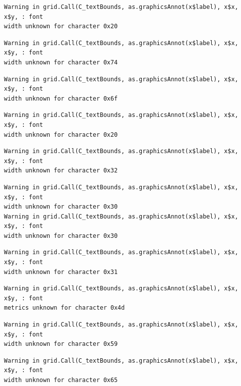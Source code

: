 \documentclass[
  letterpaper,
]{scrbook}
\begin{document}
\begin{verbatim}
Warning in grid.Call(C_textBounds, as.graphicsAnnot(x$label), x$x, x$y, : font
width unknown for character 0x20
\end{verbatim}

\begin{verbatim}
Warning in grid.Call(C_textBounds, as.graphicsAnnot(x$label), x$x, x$y, : font
width unknown for character 0x74
\end{verbatim}

\begin{verbatim}
Warning in grid.Call(C_textBounds, as.graphicsAnnot(x$label), x$x, x$y, : font
width unknown for character 0x6f
\end{verbatim}

\begin{verbatim}
Warning in grid.Call(C_textBounds, as.graphicsAnnot(x$label), x$x, x$y, : font
width unknown for character 0x20
\end{verbatim}

\begin{verbatim}
Warning in grid.Call(C_textBounds, as.graphicsAnnot(x$label), x$x, x$y, : font
width unknown for character 0x32
\end{verbatim}

\begin{verbatim}
Warning in grid.Call(C_textBounds, as.graphicsAnnot(x$label), x$x, x$y, : font
width unknown for character 0x30
Warning in grid.Call(C_textBounds, as.graphicsAnnot(x$label), x$x, x$y, : font
width unknown for character 0x30
\end{verbatim}

\begin{verbatim}
Warning in grid.Call(C_textBounds, as.graphicsAnnot(x$label), x$x, x$y, : font
width unknown for character 0x31
\end{verbatim}

\begin{verbatim}
Warning in grid.Call(C_textBounds, as.graphicsAnnot(x$label), x$x, x$y, : font
metrics unknown for character 0x4d
\end{verbatim}

\begin{verbatim}
Warning in grid.Call(C_textBounds, as.graphicsAnnot(x$label), x$x, x$y, : font
width unknown for character 0x59
\end{verbatim}

\begin{verbatim}
Warning in grid.Call(C_textBounds, as.graphicsAnnot(x$label), x$x, x$y, : font
width unknown for character 0x65
\end{verbatim}
\end{document}
